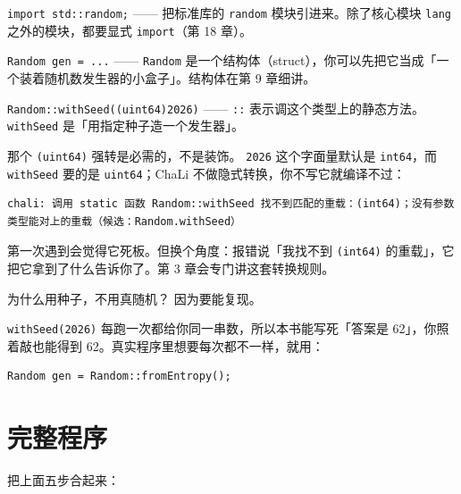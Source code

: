\texttt{import std:\allowbreak{}:\allowbreak{}random;} —— 把标准库的 \texttt{random} 模块引进来。除了核心模块 \texttt{lang} 之外的模块，都要显式 \texttt{import}（第 18 章）。

\texttt{Random gen =\allowbreak{} .\allowbreak{}.\allowbreak{}.\allowbreak{}} —— \texttt{Random} 是一个结构体（struct），你可以先把它当成「一个装着随机数发生器的小盒子」。结构体在第 9 章细讲。

\texttt{Random:\allowbreak{}:\allowbreak{}with\allowbreak{}Seed(\allowbreak{}(\allowbreak{}uint64)\allowbreak{}2026)\allowbreak{}} —— \texttt{:\allowbreak{}:\allowbreak{}} 表示调这个类型上的静态方法。\texttt{with\allowbreak{}Seed} 是「用指定种子造一个发生器」。

那个 \texttt{(\allowbreak{}uint64)\allowbreak{}} 强转是必需的，不是装饰。 \texttt{2026} 这个字面量默认是 \texttt{int64}，而 \texttt{with\allowbreak{}Seed} 要的是 \texttt{uint64}；ChaLi 不做隐式转换，你不写它就编译不过：

\par
\medskip
\begin{lstlisting}[style=out]
chali: 调用 static 函数 Random::withSeed 找不到匹配的重载：(int64)；没有参数类型能对上的重载（候选：Random.withSeed）
\end{lstlisting}
\par
\medskip

第一次遇到会觉得它死板。但换个角度：报错说「我找不到 \texttt{(\allowbreak{}int64)\allowbreak{}} 的重载」，它把它拿到了什么告诉你了。第 3 章会专门讲这套转换规则。

为什么用种子，不用真随机？ 因为要能复现。

\texttt{with\allowbreak{}Seed(\allowbreak{}2026)\allowbreak{}} 每跑一次都给你同一串数，所以本书能写死「答案是 62」，你照着敲也能得到 62。真实程序里想要每次都不一样，就用：

\par
\medskip
\begin{lstlisting}[style=chali]
Random gen = Random::fromEntropy();
\end{lstlisting}
\par
\medskip

\section{完整程序}

把上面五步合起来：


